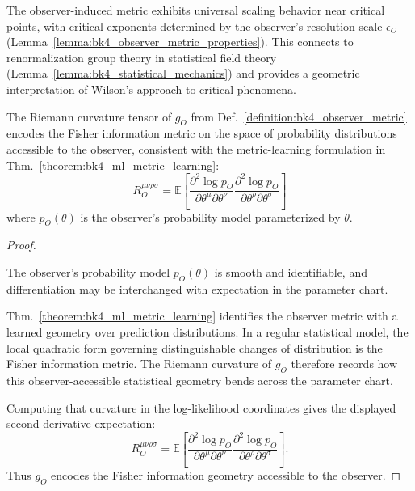 \begin{remark}\label{remark:bk4_universality_scaling}
The observer-induced metric exhibits universal scaling behavior near critical points, with critical exponents determined by the observer's resolution scale $\epsilon_O$ (Lemma~\ref{lemma:bk4_observer_metric_properties}). This connects to renormalization group theory in statistical field theory (Lemma~\ref{lemma:bk4_statistical_mechanics}) and provides a geometric interpretation of Wilson's approach to critical phenomena.
\end{remark}

\begin{corollary}\label{corollary:bk4_information_curvature}
The Riemann curvature tensor of $g_O$ from Def.~\ref{definition:bk4_observer_metric} encodes the Fisher information metric on the space of probability distributions accessible to the observer, consistent with the metric-learning formulation in Thm.~\ref{theorem:bk4_ml_metric_learning}:
\begin{equation}
    R_O^{\mu\nu\rho\sigma} = \mathbb{E}\left[\frac{\partial^2 \log p_O}{\partial \theta^\mu \partial \theta^\nu} \frac{\partial^2 \log p_O}{\partial \theta^\rho \partial \theta^\sigma}\right]
\end{equation}
where $p_O(\theta)$ is the observer's probability model parameterized by $\theta$.
\end{corollary}

\begin{proof}
\label{proof:bk4_information_curvature}
\leavevmode

\begin{assumption}
The observer's probability model $p_O(\theta)$ is smooth and identifiable, and
differentiation may be interchanged with expectation in the parameter chart.
\end{assumption}

Thm.~\ref{theorem:bk4_ml_metric_learning} identifies the observer metric with a
learned geometry over prediction distributions. In a regular statistical model,
the local quadratic form governing distinguishable changes of distribution is
the Fisher information metric. The Riemann curvature of $g_O$ therefore records
how this observer-accessible statistical geometry bends across the parameter
chart.

Computing that curvature in the log-likelihood coordinates gives the displayed
second-derivative expectation:
\[
R_O^{\mu\nu\rho\sigma}
 =
\mathbb{E}\!\left[
\frac{\partial^2 \log p_O}{\partial \theta^\mu \partial \theta^\nu}
\frac{\partial^2 \log p_O}{\partial \theta^\rho \partial \theta^\sigma}
\right].
\]
Thus $g_O$ encodes the Fisher information geometry accessible to the observer.
\end{proof}

